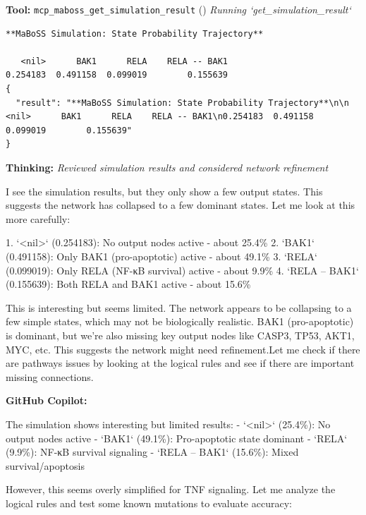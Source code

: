 \documentclass[11pt,a4paper]{article}
\begin{document}
\begin{toolokbox}
\textbf{Tool:} \texttt{mcp\_maboss\_get\_simulation\_result} (\checkmark)
\textit{Running `get\_simulation\_result`}
\begin{lstlisting}
**MaBoSS Simulation: State Probability Trajectory**

   <nil>      BAK1      RELA    RELA -- BAK1
0.254183  0.491158  0.099019        0.155639
{
  "result": "**MaBoSS Simulation: State Probability Trajectory**\n\n   <nil>      BAK1      RELA    RELA -- BAK1\n0.254183  0.491158  0.099019        0.155639"
}
\end{lstlisting}
\end{toolokbox}
\begin{thinkbox}
\textbf{Thinking:} \textit{Reviewed simulation results and considered network refinement}

I see the simulation results, but they only show a few output states. This suggests the network has collapsed to a few dominant states. Let me look at this more carefully:

1. `<nil>` (0.254183): No output nodes active - about 25.4\%
2. `BAK1` (0.491158): Only BAK1 (pro-apoptotic) active - about 49.1\% 
3. `RELA` (0.099019): Only RELA (NF-κB survival) active - about 9.9\%
4. `RELA -- BAK1` (0.155639): Both RELA and BAK1 active - about 15.6\%

This is interesting but seems limited. The network appears to be collapsing to a few simple states, which may not be biologically realistic. BAK1 (pro-apoptotic) is dominant, but we're also missing key output nodes like CASP3, TP53, AKT1, MYC, etc. This suggests the network might need refinement.Let me check if there are pathways issues by looking at the logical rules and see if there are important missing connections.

\end{thinkbox}
\begin{copilotbox}
\textbf{GitHub Copilot:}

The simulation shows interesting but limited results:
- `<nil>` (25.4\%): No output nodes active
- `BAK1` (49.1\%): Pro-apoptotic state dominant
- `RELA` (9.9\%): NF-κB survival signaling  
- `RELA -- BAK1` (15.6\%): Mixed survival/apoptosis

However, this seems overly simplified for TNF signaling. Let me analyze the logical rules and test some known mutations to evaluate accuracy:

\end{copilotbox}
\end{document}
